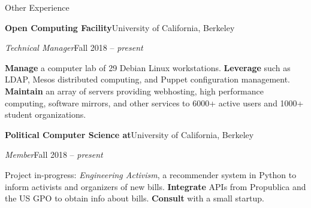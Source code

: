 \begin{minipage}[t]{0.67\textwidth}
  \vspace{10pt}

  {\sectionfont Other Experience}

  \vspace{5pt}
  \textbf{Open Computing Facility}\hfill University of California, Berkeley
  \begin{adjustwidth}{10pt}{}
    \emph{Technical Manager}\hfill Fall 2018 -- \emph{present}

    \textbf{Manage} a computer lab of 29 Debian Linux workstations.
    \textbf{Leverage}  such as LDAP, Mesos distributed computing, and Puppet configuration management.
    \textbf{Maintain} an array of servers providing webhosting, high performance computing, software mirrors, and other services to 6000+ active users and 1000+ student organizations.

  \end{adjustwidth}

  \vspace{5pt}
  \textbf{Political Computer Science at}\hfill University of California, Berkeley
  \begin{adjustwidth}{10pt}{}
    \emph{Member}\hfill Fall 2018 -- \emph{present}

    Project in-progress: \emph{Engineering Activism}, a recommender system in Python to inform activists and organizers of new bills.
    \textbf{Integrate} APIs from Propublica and the US GPO to obtain info about bills.
    \textbf{Consult} with a small startup.
  \end{adjustwidth}






\end{minipage}
